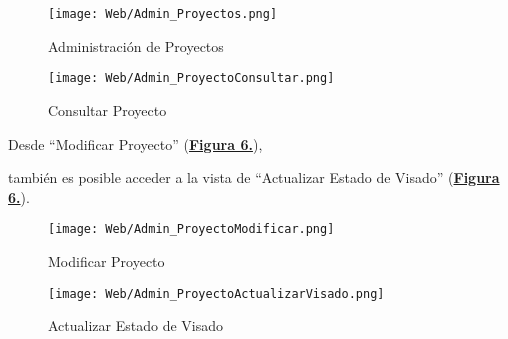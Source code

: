 \begin{figure}[!htbp]
  \centering
  \texttt{[image: Web/Admin\_Proyectos.png]}
  \caption{Administración de Proyectos}
  \label{fig:Web_Admin_Proyectos}
\end{figure}
\FloatBarrier

\begin{figure}[!h]
  \centering
  \texttt{[image: Web/Admin\_ProyectoConsultar.png]}
  \caption{Consultar Proyecto}
  \label{fig:Web_Admin_ProyectoConsultar}
\end{figure}
\FloatBarrier

Desde ``Modificar Proyecto'' (\textbf{\hyperref[fig:Web_Admin_ProyectoModificar]{Figura 6.}}),\addtocounter{figura_manual}{1} también es posible acceder a la vista de ``Actualizar Estado de Visado'' (\textbf{\hyperref[fig:Web_Admin_ProyectoActualizarVisado]{Figura 6.}}).
\begin{figure}[!h]
  \centering
  \texttt{[image: Web/Admin\_ProyectoModificar.png]}
  \caption{Modificar Proyecto}
  \label{fig:Web_Admin_ProyectoModificar}
\end{figure}
\FloatBarrier

\begin{figure}[!h]
  \centering
  \texttt{[image: Web/Admin\_ProyectoActualizarVisado.png]}
  \caption{Actualizar Estado de Visado}
  \label{fig:Web_Admin_ProyectoActualizarVisado}
\end{figure}
\FloatBarrier